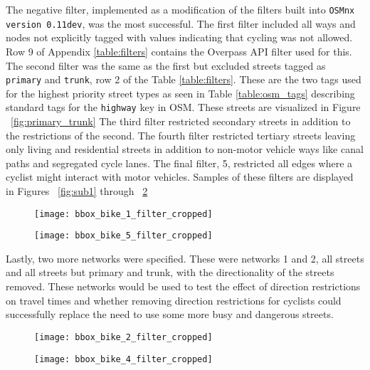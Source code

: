 The negative filter, implemented as a modification of the filters built into \texttt{OSMnx version 0.11dev}, was the most successful. The first filter included all ways and nodes not explicitly tagged with values indicating that cycling was not allowed. Row 9 of Appendix \ref{table:filters} contains the Overpass API filter used for this. The second filter was the same as the first but excluded streets tagged as \texttt{primary} and \texttt{trunk}, row 2 of the Table \ref{table:filters}. These are the two tags used for the highest priority street types as seen in Table \ref{table:osm_tags} describing standard tags for the \texttt{highway} key in OSM. These streets are visualized in Figure ~\ref{fig:primary_trunk} The third filter restricted secondary streets in addition to the restrictions of the second. The fourth filter restricted tertiary streets leaving only living and residential streets in addition to non-motor vehicle ways like canal paths and segregated cycle lanes. The final filter, 5, restricted all edges where a cyclist might interact with motor vehicles. Samples of these filters are displayed in Figures ~\ref{fig:sub1} through ~\ref{fig:sub4}

\begin{figure}
\centering
\begin{minipage}{.5\textwidth}
  \centering
  \texttt{[image: bbox\_bike\_1\_filter\_cropped]}
  \label{fig:sub1}
\end{minipage}%
\begin{minipage}{.5\textwidth}
  \centering
  \texttt{[image: bbox\_bike\_5\_filter\_cropped]}
  \label{fig:sub2}
\end{minipage}
\end{figure}


Lastly, two more networks were specified. These were networks 1 and 2, all streets and all streets but primary and trunk, with the directionality of the streets removed. These networks would be used to test the effect of direction restrictions on travel times and whether removing direction restrictions for cyclists could successfully replace the need to use some more busy and dangerous streets. 

\begin{figure}
\centering
\begin{minipage}{.5\textwidth}
  \centering
  \texttt{[image: bbox\_bike\_2\_filter\_cropped]}
  \label{fig:sub3}
\end{minipage}%
\begin{minipage}{.5\textwidth}
  \centering
  \texttt{[image: bbox\_bike\_4\_filter\_cropped]}
  \label{fig:sub4}
\end{minipage}
\end{figure}



